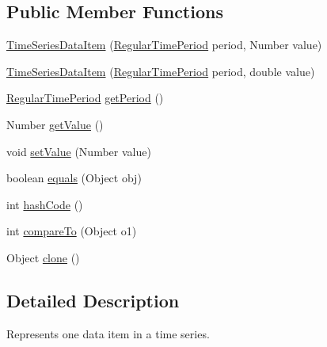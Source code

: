 \subsection*{Public Member Functions}
\begin{DoxyCompactItemize}
\item 
\mbox{\hyperlink{classorg_1_1jfree_1_1data_1_1time_1_1_time_series_data_item_affdb376e559956adcbb595cb3e761ae8}{Time\+Series\+Data\+Item}} (\mbox{\hyperlink{classorg_1_1jfree_1_1data_1_1time_1_1_regular_time_period}{Regular\+Time\+Period}} period, Number value)
\item 
\mbox{\hyperlink{classorg_1_1jfree_1_1data_1_1time_1_1_time_series_data_item_a4519034ff3a96ba5057ef380492964a3}{Time\+Series\+Data\+Item}} (\mbox{\hyperlink{classorg_1_1jfree_1_1data_1_1time_1_1_regular_time_period}{Regular\+Time\+Period}} period, double value)
\item 
\mbox{\hyperlink{classorg_1_1jfree_1_1data_1_1time_1_1_regular_time_period}{Regular\+Time\+Period}} \mbox{\hyperlink{classorg_1_1jfree_1_1data_1_1time_1_1_time_series_data_item_a9e21c70b1359379868bc6dabd2ab6984}{get\+Period}} ()
\item 
Number \mbox{\hyperlink{classorg_1_1jfree_1_1data_1_1time_1_1_time_series_data_item_aae8a91f28931ae9e1207f64124294896}{get\+Value}} ()
\item 
void \mbox{\hyperlink{classorg_1_1jfree_1_1data_1_1time_1_1_time_series_data_item_af1b0f84dad2ed0cbced4746bd9c3a8d1}{set\+Value}} (Number value)
\item 
boolean \mbox{\hyperlink{classorg_1_1jfree_1_1data_1_1time_1_1_time_series_data_item_a06742809c049524aa74574bd7d9ace62}{equals}} (Object obj)
\item 
int \mbox{\hyperlink{classorg_1_1jfree_1_1data_1_1time_1_1_time_series_data_item_ab4e1a5f876ea48a68511a7fc8fbcff1c}{hash\+Code}} ()
\item 
int \mbox{\hyperlink{classorg_1_1jfree_1_1data_1_1time_1_1_time_series_data_item_a2ef795d0a8bf1a0b9d48b8040a5a0026}{compare\+To}} (Object o1)
\item 
Object \mbox{\hyperlink{classorg_1_1jfree_1_1data_1_1time_1_1_time_series_data_item_a4a1e5b5a08f4f5937f8664c32d7131b2}{clone}} ()
\end{DoxyCompactItemize}


\subsection{Detailed Description}
Represents one data item in a time series. 

